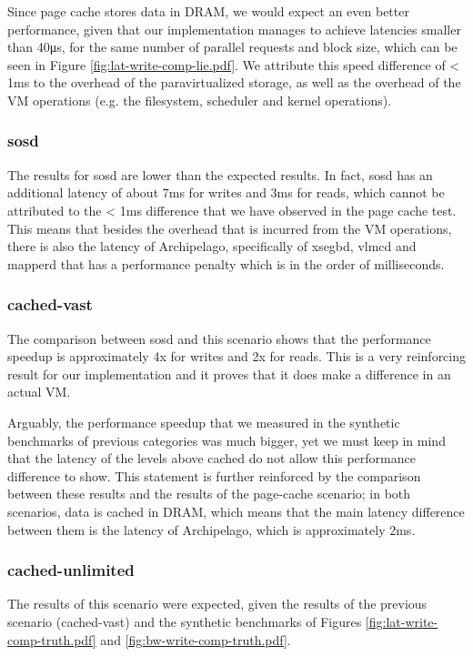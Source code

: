 Since page cache stores data in DRAM, we would expect an even better 
performance, given that our implementation manages to achieve latencies smaller
than 40μs, for the same number of parallel requests and block size, which can 
be seen in Figure \ref{fig:lat-write-comp-lie.pdf}.  We attribute this speed 
difference of < 1ms to the overhead of the paravirtualized storage, as well as 
the overhead of the VM operations (e.g. the filesystem, scheduler and kernel 
operations).

\subsubsection{sosd}

The results for sosd are lower than the expected results. In fact, sosd has an 
additional latency of about 7ms for writes and 3ms for reads, which cannot be 
attributed to the < 1ms difference that we have observed in the page cache 
test. This means that besides the overhead that is incurred from the VM 
operations, there is also the latency of Archipelago, specifically of xsegbd, 
vlmcd and mapperd that has a performance penalty which is in the order of 
milliseconds.

\subsubsection{cached-vast}

The comparison between sosd and this scenario shows that the performance 
speedup is approximately 4x for writes and 2x for reads. This is a very 
reinforcing result for our implementation and it proves that it does make a 
difference in an actual VM.

Arguably, the performance speedup that we measured in the synthetic benchmarks 
of previous categories was much bigger, yet we must keep in mind that the 
latency of the levels above cached do not allow this performance difference to 
show.  This statement is further reinforced by the comparison between these 
results and the results of the page-cache scenario; in both scenarios, data is 
cached in DRAM, which means that the main latency difference between them is 
the latency of Archipelago, which is approximately 2ms.

\subsubsection{cached-unlimited}

The results of this scenario were expected, given the results of the previous 
scenario (cached-vast) and the synthetic benchmarks of Figures 
\ref{fig:lat-write-comp-truth.pdf} and \ref{fig:bw-write-comp-truth.pdf}.

